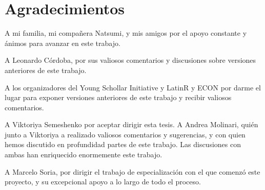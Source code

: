 \chapter*{Agradecimientos}

\noindent 

A mi familia, mi compañera Natsumi, y mis amigos por el apoyo constante y ánimos para avanzar en este trabajo. 

\bigskip

A Leonardo Córdoba, por sus valiosos comentarios y discusiones sobre versiones anteriores de este trabajo.

\bigskip

A los organizadores del Young Schollar Initiative y LatinR y ECON por darme el lugar para exponer versiones anteriores de este trabajo y recibir valiosos comentarios.

\bigskip

A Viktoriya Semeshenko por aceptar dirigir esta tesis. A Andrea Molinari, quién junto a Viktoriya a realizado valiosos comentarios y sugerencias, y con quien hemos discutido en profundidad partes de este trabajo. Las discusiones con ambas han enriquecido enormemente este trabajo.

\bigskip

A Marcelo Soria, por dirigir el trabajo de especialización con el que comenzó este proyecto, y su excepcional apoyo a lo largo de todo el proceso. 


